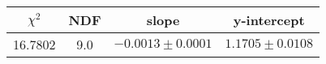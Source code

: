 \begin{tabular}{|c|c|c|c|}

\hline
$\chi^{2}$ & NDF & slope & y-intercept  \\
\hline
16.7802 & 9.0 & $-0.0013\pm0.0001$ & $1.1705\pm0.0108$ \\
\hline

\end{tabular}